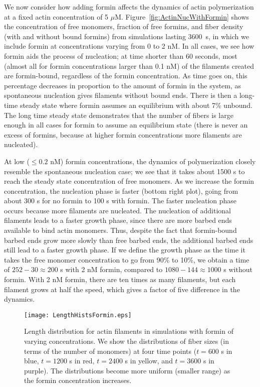 \documentclass[11pt]{article}
\begin{document}
We now consider how adding formin affects the dynamics of actin polymerization at a fixed actin concentration of 5 $\mu$M. Figure\ \ref{fig:ActinNucWithFormin} shows the concentration of free monomers, fraction of free formins, and fiber density (with and without bound formins) from simulations lasting 3600~s, in which we include formin at concentrations varying from 0 to 2 nM. In all cases, we see how formin aids the process of nucleation; at time shorter than 60 seconds, most (almost all for formin concentrations larger than 0.1 nM) of the filaments created are formin-bound, regardless of the formin concentration. As time goes on, this percentage decreases in proportion to the amount of formin in the system, as spontaneous nucleation gives filaments without bound ends. There is then a long-time steady state where formin assumes an equilibrium with about 7\% unbound. The long time steady state demonstrates that the number of fibers is large enough in all cases for formin to assume an equilibrium state (there is never an excess of formins, because at higher formin concentrations more filaments are nucleated).

At low ($\leq 0.2$ nM) formin concentrations, the dynamics of polymerization closely resemble the spontaneous nucleation case; we see that it takes about 1500 s to reach the steady state concentration of free monomers. As we increase the formin concentration, the nucleation phase is faster (bottom right plot), going from about 300 s for no formin to 100 s with formin. The faster nucleation phase occurs because more filaments are nucleated. The nucleation of additional filaments leads to a faster growth phase, since there are more barbed ends available to bind actin monomers. Thus, despite the fact that formin-bound barbed ends grow more slowly than free barbed ends, the additional barbed ends still lead to a faster growth phase. If we define the growth phase as the time it takes the free monomer concentration to go from 90\% to 10\%, we obtain a time of $252-30\approx 200$ s with 2 nM formin, compared to $1080-144 \approx 1000$ s without formin. With 2 nM formin, there are ten times as many filaments, but each filament grows at half the speed, which gives a factor of five difference in the dynamics.

\begin{figure}
\centering
\texttt{[image: LengthHistsFormin.eps]}
\caption{\label{fig:HistsWithFormin}Length distribution for actin filaments in simulations with formin of varying concentrations. We show the distributions of fiber sizes (in terms of the number of monomers) at four time points ($t=600$ s in blue, $t=1200$ s in red, $t=2400$ s in yellow, and $t=3600$ s in purple). The distributions become more uniform (smaller range) as the formin concentration increases.}
\end{figure}
\end{document}
